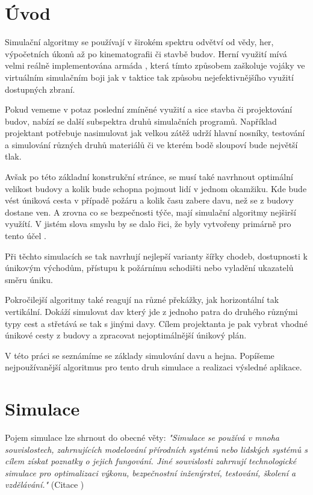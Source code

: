 \documentclass[czech,public,dept460,male,cpdeclaration]{diploma}
\begin{document}
\MakeTitlePages


\section{Úvod}
Simulační algoritmy se používají v širokém spektru odvětví od vědy, her, výpočetních úkonů až po kinematografii či stavbě budov. Herní využití mívá velmi reálně implementována armáda \cite{linkToArmySimulation}, která tímto způsobem zaškoluje vojáky ve virtuálním simulačním boji jak v taktice tak způsobu nejefektivnějšího využití dostupných zbraní. 

Pokud vememe v potaz poslední zmíněné využití a sice stavba či projektování budov, nabízí se další subspektra  druhů simulačních programů. Například projektant potřebuje nasimulovat jak velkou zátěž udrží hlavní nosníky, testování a simulování různých druhů materiálů či ve kterém bodě sloupoví bude největší tlak.

Avšak po této základní konstrukční stránce, se musí také navrhnout optimální velikost budovy a kolik bude schopna pojmout lidí v jednom okamžiku. Kde bude vést úniková cesta v případě požáru a kolik času zabere davu, než se z budovy dostane ven. A zrovna co se bezpečnosti týče, mají simulační algoritmy nejširší využítí. V jistém slova smyslu by se dalo řici,
že byly vytvořeny primárně pro tento účel \cite{link1}.

Při těchto simulacích se tak navrhují nejlepší varianty šířky chodeb, dostupnosti k únikovým východům, přístupu k požárnímu schodišti nebo vyladění ukazatelů směru
úniku.

Pokročilejší algoritmy také reagují na různé překážky, jak horizontální tak vertikální. Dokáží simulovat dav který jde z jednoho patra do druhého různými typy cest a střetává se tak s jinými davy. Cílem projektanta je pak vybrat vhodné únikové cesty z budovy a zpracovat nejoptimálnější únikový plán.

V této práci se seznámíme se základy simulování davu a hejna. Popíšeme nejpoužívanější algoritmus \cite{link2} pro tento druh simulace a realizaci výsledné aplikace.

\section{Simulace}
Pojem simulace lze shrnout do obecné věty: \textit{"Simulace se používá v mnoha souvislostech, zahrnujících modelování přírodních systémů nebo lidských systémů s cílem získat poznatky o jejich fungování. Jiné souvislosti zahrnují technologické simulace pro optimalizaci výkonu, bezpečnostní inženýrství, testování, školení a vzdělávání."} (Citace \cite{linkToSimulation})
\end{document}
